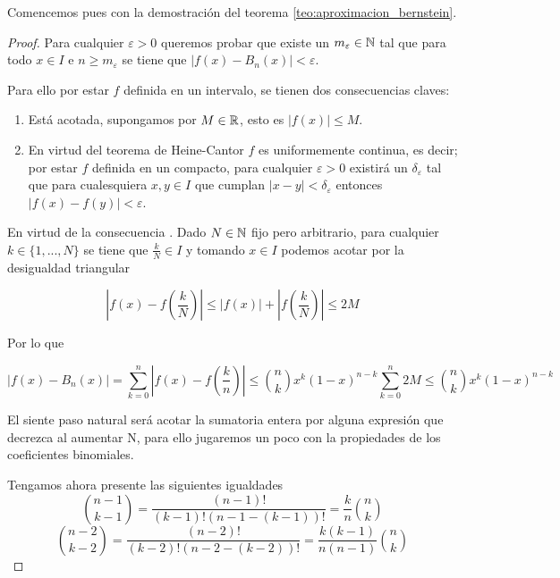 Comencemos pues con la demostración del teorema \ref{teo:aproximacion_bernstein}.
\begin{proof}
    
    Para cualquier $\varepsilon > 0$ queremos probar que existe un $m_\varepsilon  \in \mathbb{N}$ tal que para 
    todo $x \in I$ e $n \geq m_\varepsilon$  se tiene que 
    $|f(x) - B_n(x)| < \varepsilon$.
    
     Para ello por estar $f$ definida en un intervalo, 
    se tienen dos consecuencias claves: 
    \begin{enumerate}
        \item Está acotada, supongamos por $M \in \mathbb{R}$, esto es $|f(x)| \leq M$. \label{consecuencia:M}
        \item En virtud del teorema de Heine-Cantor $f$ es uniformemente continua, es decir; por estar $f$ definida en un compacto,  para cualquier $\varepsilon >0$ existirá un $\delta_\varepsilon$
        tal que para cualesquiera $x,y \in I$ que cumplan $|x-y| < \delta_\varepsilon$ entonces $|f(x)-f(y)| < \varepsilon$. \label{consecuencia:delta}
    \end{enumerate}
    En virtud de la consecuencia . 
    Dado $N \in  \mathbb{N}$ fijo pero arbitrario, para cualquier $k \in \{1, ..., N\}$ se tiene que
    $\frac{k}{N} \in I$ y tomando $x \in I$ podemos acotar por la desigualdad triangular

    $$\left|f(x)- f\left( \frac{k}{N} \right) \right| \leq |f(x)| + \left|f \left( \frac{k}{N}\right) \right|\leq 2M$$  

    Por lo que 

    \begin{equation*}
        |f(x)-B_n(x)| = \sum_{k=0}^n \left|f(x) - f \left( \frac{k}{n} \right)\right| \leq
    \binom{n}{k} x^{k} (1-x)^{n-k}
    \sum_{k=0}^n 2M \leq
    \binom{n}{k} x^{k} (1-x)^{n-k}
    \end{equation*}

    El siente paso natural será acotar la sumatoria entera por alguna expresión que decrezca al aumentar N, para ello jugaremos un poco con la propiedades de los coeficientes binomiales. 

   

    Tengamos ahora presente las siguientes igualdades 
    \begin{equation} \label{eq:binomio_menos_uno}
        \binom{n-1}{k-1} = \frac{(n-1)!}{(k-1)! (n-1-(k-1))!} = \frac{k}{n} \binom{n}{k}
    \end{equation}
    \begin{equation} \label{eq:binomio_menos_dos}
        \binom{n-2}{k-2} = \frac{(n-2)!}{(k-2)! (n-2-(k-2))!} = \frac{k(k-1)}{n(n-1)} \binom{n}{k}
    \end{equation}


\end{proof}
